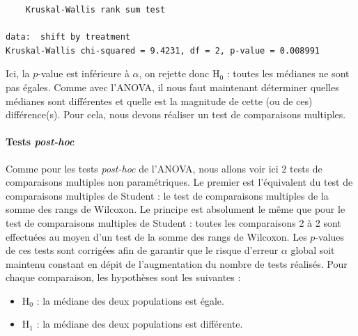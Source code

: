 \documentclass[
  a4paper,
]{article}
\newenvironment{Shaded}{\begin{snugshade}}{\end{snugshade}}
\newcommand{\CommentTok}[1]{\textcolor[rgb]{0.54,0.53,0.53}{#1}}
\newcommand{\FunctionTok}[1]{\textcolor[rgb]{0.39,0.29,0.61}{#1}}
\newcommand{\NormalTok}[1]{\textcolor[rgb]{0.12,0.11,0.11}{#1}}
\newcommand{\OtherTok}[1]{\textcolor[rgb]{0.00,0.43,0.16}{#1}}
\newcommand{\SpecialCharTok}[1]{\textcolor[rgb]{0.24,0.68,0.91}{#1}}
\providecommand{\tightlist}{%
  \setlength{\itemsep}{0pt}\setlength{\parskip}{0pt}}
\begin{document}
\begin{verbatim}
    Kruskal-Wallis rank sum test

data:  shift by treatment
Kruskal-Wallis chi-squared = 9.4231, df = 2, p-value = 0.008991
\end{verbatim}

Ici, la \(p\)-value est inférieure à \(\alpha\), on rejette donc H\(_0\) : toutes les médianes ne sont pas égales. Comme avec l'ANOVA, il nous faut maintenant déterminer quelles médianes sont différentes et quelle est la magnitude de cette (ou de ces) différence(s). Pour cela, nous devons réaliser un test de comparaisons multiples.

\hypertarget{tests-post-hoc-1}{%
\paragraph{\texorpdfstring{Tests \emph{post-hoc}}{Tests post-hoc}}\label{tests-post-hoc-1}}

Comme pour les tests \emph{post-hoc} de l'ANOVA, nous allons voir ici 2 tests de comparaisons multiples non paramétriques. Le premier est l'équivalent du test de comparaisons multiples de Student : le test de comparaisons multiples de la somme des rangs de Wilcoxon. Le principe est absolument le même que pour le test de comparaisons multiples de Student : toutes les comparaisons 2 à 2 sont effectuées au moyen d'un test de la somme des rangs de Wilcoxon. Les \(p\)-values de ces tests sont corrigées afin de garantir que le risque d'erreur \(\alpha\) global soit maintenu constant en dépit de l'augmentation du nombre de tests réalisés. Pour chaque comparaison, les hypothèses sont les suivantes :

\begin{itemize}
\tightlist
\item
  H\(_0\) : la médiane des deux populations est égale.
\item
  H\(_1\) : la médiane des deux populations est différente.
\end{itemize}

\begin{Shaded}
\end{Shaded}
\end{document}
